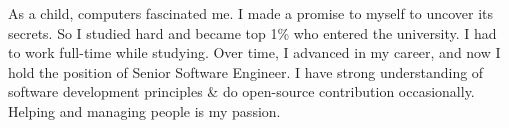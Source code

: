 As a child, computers fascinated me. I made a promise to myself to uncover its secrets.
So I studied hard and became top 1\% who entered the university. I had to work full-time while studying. Over time, I advanced in my career, and now I hold the position of Senior Software Engineer. I have strong understanding of software development principles \& do open-source contribution occasionally. Helping and managing people is my passion.